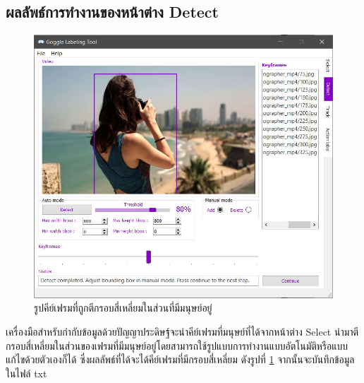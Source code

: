 \subsection*{ผลลัพธ์การทำงานของหน้าต่าง Detect}
\begin{figure}[!ht]
  \centering
    \includegraphics[scale=0.60]{chapter4/images/Result/result_select4.jpg}
    \caption{รูปคีย์เฟรมที่ถูกตีกรอบสี่เหลี่ยมในส่วนที่มีมนุษย์อยู่}
    \label{fig:result_detect}
\end{figure}
\clearpage
เครื่องมือสำหรับกำกับข้อมูลด้วยปัญญาประดิษฐ์จะนำคีย์เฟรมที่มนุษย์ที่ได้จากหน้าต่าง Select นำมาตีกรอบสี่เหลี่ยมในส่วนของเฟรมที่มีมนุษย์อยู่โดยสามารถใช้รูปแบบการทำงานแบบอัตโนมัติหรือแบบแก้ไขด้วยตัวเองก็ได้ 
ซึ่งผลลัพธ์ที่ได้จะได้คีย์เฟรมที่มีกรอบสี่เหลี่ยม ดังรูปที่ \ref{fig:result_detect} จากนั้นจะบันทึกข้อมูลในไฟล์ txt 

